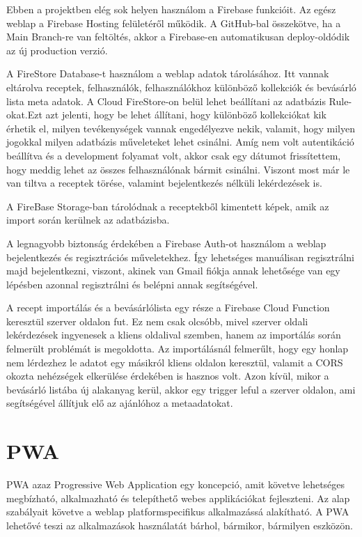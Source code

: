 \documentclass[12pt]{report}
\theoremstyle{definition}
\begin{document}
Ebben a projektben elég sok helyen használom a Firebase funkcióit. Az egész weblap a Firebase Hosting felületéről működik. A GitHub-bal összekötve, ha a Main Branch-re van feltöltés, akkor a Firebase-en automatikusan deploy-oldódik az új production verzió.

A FireStore Database-t használom a weblap adatok tárolásához. Itt vannak eltárolva  receptek, felhasználók, felhasználókhoz különböző kollekciók és bevásárló lista meta adatok. A Cloud FireStore-on belül lehet beállítani az adatbázis Rule-okat.Ezt azt jelenti, hogy be lehet állítani, hogy különböző kollekciókat kik érhetik el, milyen tevékenységek vannak engedélyezve nekik, valamit, hogy milyen jogokkal milyen adatbázis műveleteket lehet csinálni. Amíg nem volt autentikáció beállítva és a development folyamat volt, akkor csak egy dátumot frissítettem, hogy meddig lehet az összes felhasználónak bármit csinálni. Viszont most már le van tiltva a receptek törése, valamint bejelentkezés nélküli lekérdezések is.

A FireBase Storage-ban tárolódnak a receptekből kimentett képek, amik az import során kerülnek az adatbázisba.

A legnagyobb biztonság érdekében a Firebase Auth-ot használom a weblap bejelentkezés és regisztrációs műveletekhez. Így lehetséges manuálisan regisztrálni majd bejelentkezni, viszont, akinek van Gmail fiókja annak lehetősége van egy lépésben azonnal regisztrálni és belépni annak segítségével.

A recept importálás és a bevásárlólista egy része a Firebase Cloud Function keresztül szerver oldalon fut. Ez nem csak olcsóbb, mivel szerver oldali lekérdezések ingyenesek a kliens oldalival szemben, hanem az importálás során felmerült problémát is megoldotta. Az importálásnál felmerűlt, hogy egy honlap nem lérdezhez le adatot egy másikról kliens oldalon keresztül, valamit a CORS okozta nehézségek elkerülése érdekében is hasznos volt. Azon kívül, mikor a bevásárló listába új alakanyag kerül, akkor egy trigger leful a szerver oldalon, ami segítségével állítjuk elő az ajánlóhoz a metaadatokat.

\section{PWA}
PWA azaz Progressive Web Application egy koncepció, amit követve lehetséges megbízható, alkalmazható és telepíthető webes applikációkat fejleszteni. Az alap szabályait követve a weblap platformspecifikus alkalmazássá alakítható. A PWA lehetővé teszi az alkalmazások használatát bárhol, bármikor, bármilyen eszközön. 
\end{document}
